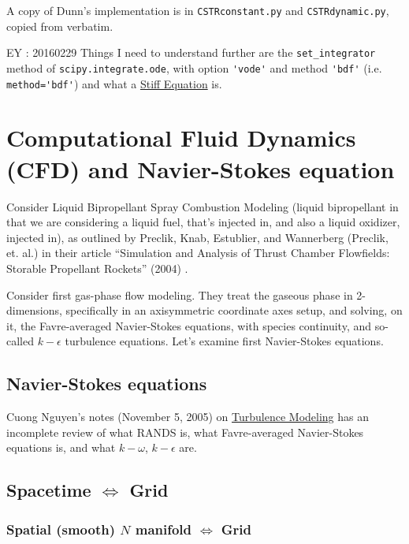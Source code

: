 \documentclass[10pt]{amsart}
\begin{document}
\begin{multicols*}{2}
A copy of Dunn's implementation is in \verb|CSTRconstant.py| and \verb|CSTRdynamic.py|, copied from verbatim.  

EY : 20160229 Things I need to understand further are the \verb|set_integrator| method of \verb|scipy.integrate.ode|, with option \verb|'vode'| and method \verb|'bdf'| (i.e. \verb|method='bdf'|) and what a \href{https://en.wikipedia.org/wiki/Stiff_equation}{Stiff Equation} is. 

\section{Computational Fluid Dynamics (CFD) and Navier-Stokes equation}

Consider Liquid Bipropellant Spray Combustion Modeling (liquid bipropellant in that we are considering a liquid fuel, that's injected in, and also a liquid oxidizer, injected in), as outlined by Preclik, Knab, Estublier, and Wannerberg (Preclik, et. al.) in their article ``Simulation and Analysis of Thrust Chamber Flowfields: Storable Propellant Rockets'' (2004) \cite{YHHP2004}.  

Consider first gas-phase flow modeling.  They treat the gaseous phase in 2-dimensions, specifically in an axisymmetric coordinate axes setup, and solving, on it, the Favre-averaged Navier-Stokes equations, with species continuity, and so-called $k-\epsilon$ turbulence equations.  Let's examine first Navier-Stokes equations.

\subsection{Navier-Stokes equations}

Cuong Nguyen's notes (November 5, 2005) on \href{http://www.mit.edu/~cuongng/Site/Publication_files/TurbulenceModeling_04NOV05.pdf}{Turbulence Modeling} has an incomplete review of what RANDS is, what Favre-averaged Navier-Stokes equations is, and what $k-\omega$, $k-\epsilon$ are.    

\subsection{Spacetime $\Longleftrightarrow$ Grid}

\subsubsection{Spatial (smooth) $N$ manifold $\Longleftrightarrow$ Grid }


\end{multicols*}
\end{document}
